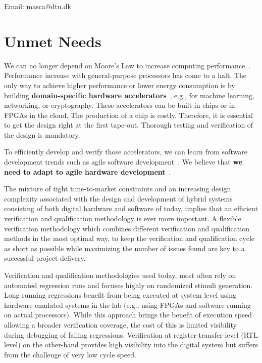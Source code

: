 \documentclass[fleqn,12pt]{article}
\begin{document}
\noindent Email: masca@dtu.dk


\newpage
\section*{Unmet Needs}

We can no longer depend on Moore's Law to increase computing performance~\cite{dark-silicon:2011}.
Performance increase with general-purpose processors has come to a halt.
The only way to achieve higher performance or lower energy consumption
is by building {\bf domain-specific hardware accelerators}~\cite{domain-hw-acc:2020},
e.g., for machine learning, networking, or cryptography.
These accelerators can be built in chips or in FPGAs in the cloud.
The production of a chip is costly. Therefore, it is essential to get
the design right at the first tape-out. Thorough testing and verification of the design is mandatory.

To efficiently develop and verify those accelerators, we can learn from software development trends such as agile software development~\cite{agile:manifesto}.
We believe that {\bf we need to adapt to agile hardware development}~\cite{henn-patt:turing:2019}.

The mixture of tight time-to-market constraints and an increasing design complexity associated with the design and development of hybrid systems consisting of both digital hardware and software of today, implies that an efficient verification and qualification methodology is ever more important. 
A flexible verification methodology which combines different verification and qualification methods in the most optimal way, to keep the verification and qualification cycle as short as possible while maximizing the number of issues found are key to a successful project delivery.

Verification and qualification methodologies used today, most often rely on automated regression runs and focuses highly on randomized stimuli generation. Long running regressions benefit from being executed at system level using hardware emulated systems in the lab (e.g., using FPGAs and software running on actual processors). While this approach brings the benefit of execution speed allowing a broader verification coverage, the cost of this is limited visibility during debugging of failing regressions. Verification at register-transfer-level (RTL level) on the other-hand provides high visibility into the digital system but suffers from the challenge of very low cycle speed.
\end{document}
